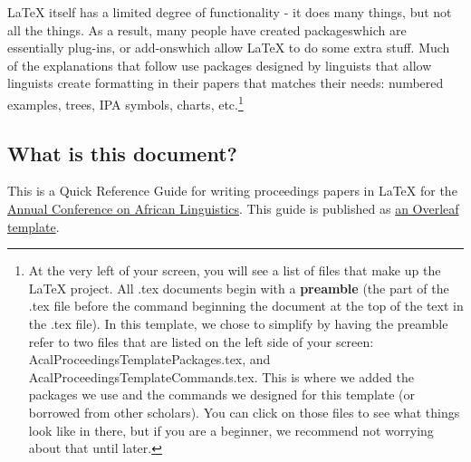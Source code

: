 \documentclass[output=paper,colorlinks,citecolor=brown,
]{langscibook}
\begin{document}
LaTeX itself has a limited degree of functionality - it does many things, but not all the things. As a result, many people have created packages\textemdash which are essentially plug-ins, or add-ons\textemdash which allow LaTeX to do some extra stuff. Much of the explanations that follow use packages designed by linguists that allow linguists create formatting in their papers that matches their needs: numbered examples, trees, IPA symbols, charts, etc.\footnote{At the very left of your screen, you will see a list of files that make up the \LaTeX{} project. All .tex documents begin with a \textbf{preamble} (the part of the .tex file before the command beginning the document at the top of the text in the .tex file). In this template, we chose to simplify by having the preamble refer to two files that are listed on the left side of your screen: AcalProceedingsTemplatePackages.tex, and AcalProceedingsTemplateCommands.tex. This is where we added the packages we use and the commands we designed for this template (or borrowed from other scholars). You can click on those files to see what things look like in there, but if you are a beginner, we recommend not worrying about that until later.} 

\subsection{What is this document?}

This is a Quick Reference Guide for writing proceedings papers in \LaTeX{} for the \href{https://acal.linguistlist.org}{Annual Conference on African Linguistics}. This guide is published as \href{https://www.overleaf.com/latex/templates/acal-proceedings-latex-quick-reference-guide/fncrcrtgnxhv}{an Overleaf template}. 
\end{document}
